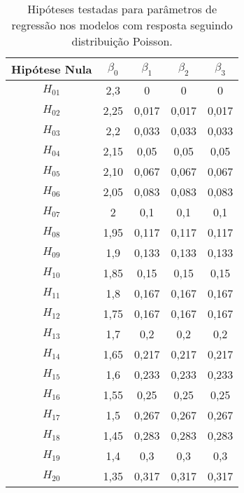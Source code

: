 
\begin{table}[H]
\centering
\begin{tabular}{c|cccc}
\hline
Hipótese Nula & $\beta_0$ & $\beta_1$ & $\beta_2$ & $\beta_3$ \\ \hline
$H_{01}$      & 2,3       & 0         & 0         & 0         \\
$H_{02}$      & 2,25      & 0,017     & 0,017     & 0,017     \\
$H_{03}$      & 2,2       & 0,033     & 0,033     & 0,033     \\
$H_{04}$      & 2,15      & 0,05      & 0,05      & 0,05      \\
$H_{05}$      & 2,10      & 0,067     & 0,067     & 0,067     \\
$H_{06}$      & 2,05      & 0,083     & 0,083     & 0,083     \\
$H_{07}$      & 2         & 0,1       & 0,1       & 0,1       \\
$H_{08}$      & 1,95      & 0,117     & 0,117     & 0,117     \\
$H_{09}$      & 1,9       & 0,133     & 0,133     & 0,133     \\
$H_{10}$      & 1,85      & 0,15      & 0,15      & 0,15      \\
$H_{11}$      & 1,8       & 0,167     & 0,167     & 0,167     \\
$H_{12}$      & 1,75      & 0,167     & 0,167     & 0,167     \\
$H_{13}$      & 1,7       & 0,2       & 0,2       & 0,2       \\
$H_{14}$      & 1,65      & 0,217     & 0,217     & 0,217     \\
$H_{15}$      & 1,6       & 0,233     & 0,233     & 0,233     \\
$H_{16}$      & 1,55      & 0,25      & 0,25      & 0,25      \\
$H_{17}$      & 1,5       & 0,267     & 0,267     & 0,267     \\
$H_{18}$      & 1,45      & 0,283     & 0,283     & 0,283     \\
$H_{19}$      & 1,4       & 0,3       & 0,3       & 0,3       \\
$H_{20}$      & 1,35      & 0,317     & 0,317     & 0,317      \\ \hline
\end{tabular}
\caption{Hipóteses testadas para parâmetros de regressão nos modelos com resposta seguindo distribuição Poisson.}
\label{tab:hipoteses_beta_poisson}
\end{table}

